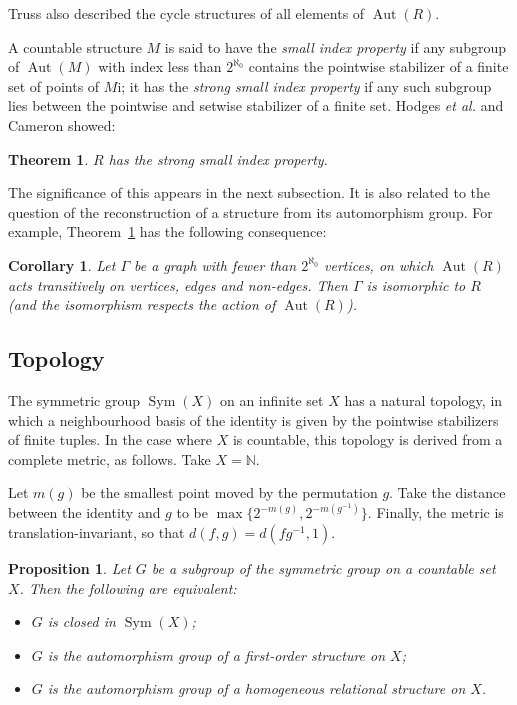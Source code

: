 \documentclass[12pt]{article}
\newtheorem{theorem}{Theorem}
\newtheorem{proposition}{Proposition}
\newtheorem{corollary}{Corollary}
\DeclareMathOperator{\Sym}{Sym}
\DeclareMathOperator{\Aut}{Aut}
\begin{document}
Truss also described the cycle structures of all elements of 
$\Aut(R)$.

A countable structure $M$ is said to have the \emph{small index
property} if any subgroup of $\Aut(M)$ with index less than
$2^{\aleph_0}$ contains the pointwise stabilizer of a finite set of
points of $M$i; it has the \emph{strong small index property} if any
such subgroup lies between the pointwise and setwise stabilizer of a finite
set. Hodges {\it et al.} \cite{ch32:bib29} and Cameron \cite{ch32:new4}
showed:

\begin{theorem}\label{ch32:them8.2} 
$R$ has the strong small index property.
\end{theorem}

The significance of this appears in the next subsection.
It is also related to the question of the reconstruction of a
structure from its automorphism group. For example,
Theorem~\ref{ch32:them8.2} has the following consequence:

\begin{corollary}\label{ch32:coro8.1}
Let $\Gamma$ be a graph with fewer than $2^{\aleph_0}$
vertices, on which $\Aut(R)$ acts transitively on vertices,
edges and non-edges. Then $\Gamma$ is isomorphic to $R$ (and the
isomorphism respects the action of $\Aut(R)$).
\end{corollary}

\subsection{Topology}

The symmetric group $\Sym(X)$ on an infinite set $X$ has a natural topology,
in which a neighbourhood basis of the identity is given by the pointwise
stabilizers of finite tuples. In the case where $X$ is countable, this
topology is derived from a complete metric, as follows. Take
$X=\mathbb{N}$.

Let $m(g)$ be the smallest point moved by the permutation $g$. Take the
distance between the identity and $g$ to be $\max\{2^{-m(g)},2^{-m(g^{-1})}\}$.
Finally, the metric is translation-invariant, so that $d(f,g)=d(fg^{-1},1)$.

\begin{proposition}
Let $G$ be a subgroup of the symmetric group on a countable set $X$. Then the
following are equivalent:
\begin{itemize}
\item[(a)] $G$ is closed in $\Sym(X)$;
\item[(b)] $G$ is the automorphism group of a first-order structure on $X$;
\item[(c)] $G$ is the automorphism group of a homogeneous relational structure
on $X$.
\end{itemize}
\end{proposition}
\end{document}
